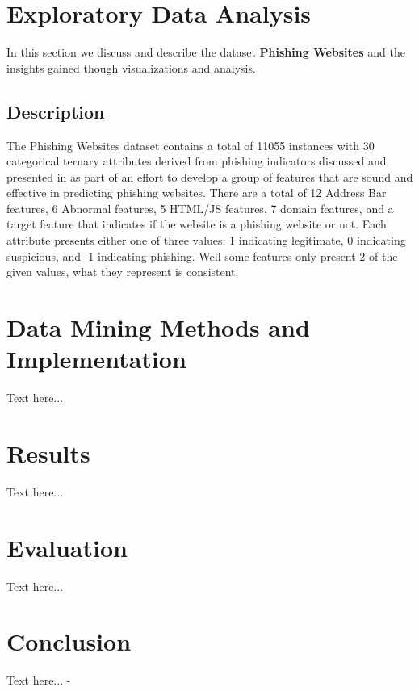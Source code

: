 \documentclass{sigkddExp}
\begin{document}
\section{Exploratory Data Analysis}
\label{eda}
In this section we discuss and describe the dataset \textbf{Phishing Websites} and the insights gained though visualizations and analysis.
\subsection{Description}
\label{descprition}
The Phishing Websites dataset contains a total of 11055 instances with 30 categorical ternary attributes derived from phishing indicators discussed and presented in \cite{6470857} as part of an effort to develop a group of features that are sound and effective in predicting phishing websites. There are a total of 12 Address Bar features, 6 Abnormal features, 5 HTML/JS features, 7 domain features, and a target feature that indicates if the website is a phishing website or not. Each attribute presents either one of three values: 1 indicating legitimate, 0 indicating suspicious, and -1 indicating phishing. Well some features only present 2 of the given values, what they represent is consistent.


 
\section{Data Mining Methods and Implementation}
Text here...

\section{Results}
Text here...

\section{Evaluation}
Text here...

\section{Conclusion}
Text here...
-

%



\end{document}
